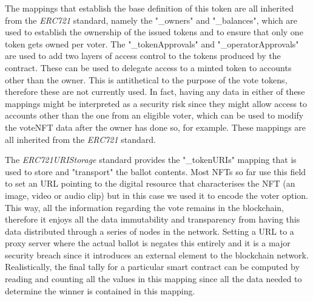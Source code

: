 \documentclass[../main.tex]{subfiles}
\begin{document}
The mappings that establish the base definition of this token are all inherited from the \textit{ERC721} standard, namely the "\_owners" and "\_balances", which are used to establish the ownership of the issued tokens and to ensure that only one token gets owned per voter.
The "\_tokenApprovals" and "\_operatorApprovals" are used to add two layers of access control to the tokens produced by the contract. These can be used to delegate access to a minted token to accounts other than the owner. This is antithetical to the purpose of the vote tokens, therefore these are not currently used. In fact, having any data in either of these mappings might be interpreted as a security risk since they might allow access to accounts other than the one from an eligible voter, which can be used to modify the voteNFT data after the owner has done so, for example. These mappings are all inherited from the \textit{ERC721} standard.
\par
The \textit{ERC721URIStorage} standard provides the "\_tokenURIs" mapping that is used to store and "transport" the ballot contents. Most NFTs so far use this field to set an URL pointing to the digital resource that characterises the NFT (an image, video or audio clip) but in this case we used it to encode the voter option. This way, all the information regarding the vote remains in the blockchain, therefore it enjoys all the data immutability and transparency from having this data distributed through a series of nodes in the network. Setting a URL to a proxy server where the actual ballot is negates this entirely and it is a major security breach since it introduces an external element to the blockchain network. Realistically, the final tally for a particular smart contract can be computed by reading and counting all the values in this mapping since all the data needed to determine the winner is contained in this mapping.
\par
\end{document}
